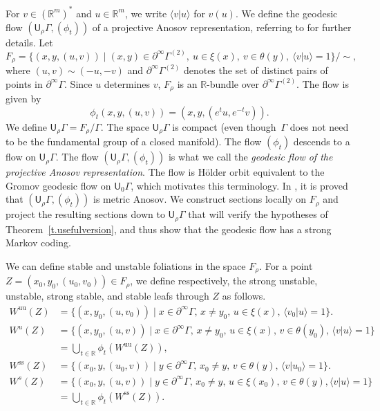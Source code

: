 \documentclass[11pt]{article}
\let\sep\mid
\newcommand{\sts}{\mathrm{ss}}
\newcommand{\uu}{\mathrm{uu}}
\theoremstyle{definition}
\numberwithin{equation}{section}
\begin{document}
For $v\in (\mathbb{R}^m)^*$ and $u\in\mathbb{R}^m$, we write $\langle v | u \rangle$ for $v(u)$. We define the geodesic flow $(\mathsf{U}_\rho\Gamma,(\phi_t))$ of a projective Anosov representation, referring to \cite[\S4]{bcls} for further details. Let\vspace*{-3pt}
\[ F_\rho = \bigl\{ (x,y,(u,v)) \sep (x,y)\in\partial^\infty\Gamma^{(2)}, \ u\in \xi(x), \ v\in \theta(y), \ \langle v|u\rangle =1\bigr\}\big/\sim,\]
where $(u,v)\sim(-u,-v)$ and $\partial^\infty\Gamma^{(2)}$ denotes the set of distinct pairs of points in $\partial^\infty\Gamma$. Since $u$ determines $v$, $F_\rho$ is an $\mathbb{R}$-bundle over $\partial^\infty\Gamma^{(2)}$. The flow is given by\vspace*{-3pt}
\[ \phi_t(x,y,(u,v)) = (x,y,(e^tu,e^{-t}v)).\]
We define $\mathsf{U}_\rho\Gamma = F_\rho/\Gamma$. The space $\mathsf{U}_\rho\Gamma$ is compact \cite[Prop.\,4.1]{bcls} (even though~$\Gamma$ does not need to be the fundamental group of a closed manifold). The flow $(\phi_t)$ \hbox{descends} to a flow on $\mathsf{U}_\rho\Gamma$. The flow $(\mathsf{U}_\rho\Gamma, (\phi_t))$ is what we call the \emph{geodesic flow of the projective Anosov representation}. The flow is Hölder orbit equivalent to the \hbox{Gromov} geodesic flow on $\mathsf{U}_0\Gamma$, which motivates this terminology. In \cite[Th.\,1.10]{bcls}, it is proved that $(\mathsf{U}_\rho\Gamma, (\phi_t))$ is metric Anosov. We construct sections locally on $F_\rho$ and project the resulting sections down to $\mathsf{U}_\rho\Gamma$ that will verify the hypotheses of Theorem~\ref{t.usefulversion}, and thus show that the geodesic flow has a strong Markov coding.

We can define stable and unstable foliations in the space $F_\rho$. For a point $Z=(x_0,y_0,(u_0,v_0))\in F_\rho$, we define respectively, the strong unstable, unstable, strong stable, and stable leafs through $Z$ as follows.\vspace*{-3pt}
\begin{align*}
W^{\uu}(Z) &=\{ (x,y_0,(u,v_0)) \sep x\in\partial^\infty\Gamma,\, x\neq y_0,\, u\in\xi(x),\, \langle v_0|u \rangle =1\}. \\
W^u(Z) &=\{ (x,y_0,(u,v)) \sep x\in\partial^\infty\Gamma,\, x\neq y_0,\, u\in\xi(x),\, v\in\theta(y_0),\, \langle v|u \rangle =1\} \\
& = \bigcup_{t\in\mathbb{R}} \phi_t(W^{\uu}(Z)), \\
W^{\sts}(Z) &=\{ (x_0,y,(u_0,v)) \sep y\in\partial^\infty\Gamma,\, x_0\neq y,\, v\in\theta(y),\, \langle v|u_0 \rangle =1\}. \\
W^s (Z) &=\{ (x_0,y,(u,v)) \sep y\in\partial^\infty\Gamma,\, x_0\neq y,\, u\in\xi(x_0),\, v\in\theta(y), \langle v|u \rangle =1\} \\
& = \bigcup_{t\in\mathbb{R}} \phi_t(W^{\sts}(Z)).
\end{align*}
\end{document}
